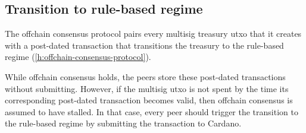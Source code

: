 \documentclass[../hydrozoa.tex]{subfiles}
\begin{document}
\subsection{Transition to rule-based regime}%
\label{h:rule-based-transition}

The offchain consensus protocol pairs every multisig treasury utxo that it creates with a post-dated transaction that transitions the treasury to the rule-based regime (\cref{h:offchain-consensus-protocol}).

While offchain consensus holds, the peers store these post-dated transactions without submitting.
However, if the multisig utxo is not spent by the time its corresponding post-dated transaction becomes valid, then offchain consensus is assumed to have stalled.
In that case, every peer should trigger the transition to the rule-based regime by submitting the transaction to Cardano.
\end{document}
